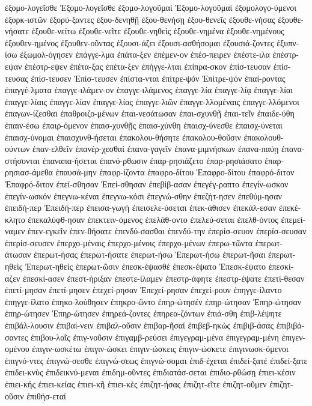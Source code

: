 {ἐξομο-λογεῖσθε
Ἐξομο-λογεῖσθε
ἐξομο-λογοῦμαί
Ἐξομο-λογοῦμαί
ἐξομολογο-ύμενοι
ἐξορκ-ιστῶν
ἐξορύ-ξαντες
ἐξου-δενηθῇ
ἐξου-θενήσῃ
ἐξου-θενεῖς
ἐξουθε-νήσας
ἐξουθε-νήσατε
ἐξουθε-νείτω
ἐξουθε-νεῖτε
ἐξουθε-νηθεὶς
ἐξουθε-νημένα
ἐξουθε-νημένους
ἐξουθεν-ημένος
ἐξουθεν-οῦντας
ἐξουσι-άζει
ἐξουσι-ασθήσομαι
ἐξουσιά-ζοντες
ἐξυπν-ίσω
ἐξωμολ-όγησεν
ἐπάγγε-λμα
ἐπάτα-ξεν
ἐπέμεν-ον
ἐπέσ-πειρεν
ἐπέστε-ιλα
ἐπέστρ-εψαν
ἐπέστρ-εψεν
ἐπέτα-ξας
ἐπέτα-ξεν
ἐπήγγε-λται
ἐπίπρα-σκον
ἐπίσ-τευσαν
ἐπίσ-τευσας
ἐπίσ-τευσεν
Ἐπίσ-τευσεν
ἐπίστα-νται
ἐπίτρε-ψόν
Ἐπίτρε-ψόν
ἐπαί-ροντας
ἐπαγγέ-λματα
ἐπαγγε-ιλάμεν-ον
ἐπαγγε-ιλάμενος
ἐπαγγε-λία
ἐπαγγε-λίᾳ
ἐπαγγε-λίαι
ἐπαγγε-λίαις
ἐπαγγε-λίαν
ἐπαγγε-λίας
ἐπαγγε-λιῶν
ἐπαγγε-λλομέναις
ἐπαγγε-λλόμενοι
ἐπαγων-ίζεσθαι
ἐπαθροιζο-μένων
ἐπαι-νεσάτωσαν
ἐπαι-σχυνθῇ
ἐπαι-τεῖν
ἐπαιδε-ύθη
ἐπαιν-έσω
ἐπαιρ-όμενον
ἐπαισ-χυνθῇς
ἐπαισ-χύνθη
ἐπαισχ-ύνεσθε
ἐπαισχ-ύνεται
ἐπαισχ-ύνομαι
ἐπαισχυνθ-ήσεται
ἐπακολου-θήσητε
ἐπακολου-θοῦσιν
ἐπακολουθ-ούντων
ἐπαν-ελθεῖν
ἐπανέρ-χεσθαί
ἐπανα-γαγεῖν
ἐπανα-μιμνήσκων
ἐπανα-παύῃ
ἐπανα-στήσονται
ἐπαναπα-ήσεται
ἐπανό-ρθωσιν
ἐπαρ-ρησιάζετο
ἐπαρ-ρησιάσατο
ἐπαρ-ρησιασ-άμεθα
ἐπαυσά-μην
ἐπαφρ-ίζοντα
ἐπαφρο-δίτου
Ἐπαφρο-δίτου
ἐπαφρό-διτον
Ἐπαφρό-διτον
ἐπεί-σθησαν
Ἐπεί-σθησαν
ἐπεβίβ-ασαν
ἐπεγέγ-ραπτο
ἐπεγίν-ωσκον
ἐπεγίν-ωσκόν
ἐπεγνω-κέναι
ἐπεγνω-κόσι
ἐπεγνώ-σθην
ἐπεζήτ-ησεν
ἐπεθύμ-ησαν
ἐπειδή-περ
Ἐπειδή-περ
ἐπεισα-γωγὴ
ἐπεισελε-ύσεται
ἐπεκ-άθισεν
ἐπεκάλ-εσαν
ἐπεκέ-κλητο
ἐπεκαλύφθ-ησαν
ἐπεκτειν-όμενος
ἐπελάθ-οντο
ἐπελεύ-σεται
ἐπελθ-όντος
ἐπεμεί-ναμεν
ἐπεν-εγκεῖν
ἐπεν-θήσατε
ἐπενδύ-σασθαι
ἐπενδύ-την
ἐπερίσ-σευον
ἐπερίσ-σευσαν
ἐπερίσ-σευσεν
ἐπερχο-μέναις
ἐπερχο-μένοις
ἐπερχο-μένων
ἐπερω-τῶντα
ἐπερωτ-άτωσαν
ἐπερωτ-ήσας
ἐπερωτ-ήσατε
ἐπερωτ-ήσω
Ἐπερωτ-ήσω
ἐπερωτ-ῆσαι
ἐπερωτ-ηθεὶς
Ἐπερωτ-ηθεὶς
ἐπερωτ-ῶσιν
ἐπεσκ-έψασθέ
ἐπεσκ-έψατο
Ἐπεσκ-έψατο
ἐπεσκί-αζεν
ἐπεσκί-ασεν
ἐπεστ-ήριξαν
ἐπεστε-ίλαμεν
ἐπεστρ-άφητε
ἐπεστρ-έψατε
ἐπετί-θεσαν
ἐπετί-μησαν
ἐπετί-μησεν
ἐπεχεί-ρησαν
Ἐπεχεί-ρησαν
ἐπεχεί-ρουν
ἐπηγγε-ίλαντο
ἐπηγγε-ίλατο
ἐπηκο-λούθησεν
ἐπηκρο-ῶντο
ἐπηρ-ώτησέν
ἐπηρ-ώτησαν
Ἐπηρ-ώτησαν
ἐπηρ-ώτησεν
Ἐπηρ-ώτησεν
ἐπηρεά-ζοντες
ἐπηρεα-ζόντων
ἐπιά-σθη
ἐπιβ-λέψητε
ἐπιβάλ-λουσιν
ἐπιβαί-νειν
ἐπιβαλ-οῦσιν
ἐπιβαρ-ῆσαί
ἐπιβεβ-ηκὼς
ἐπιβιβ-άσας
ἐπιβιβά-σαντες
ἐπιβου-λαῖς
ἐπιγ-νοῦσιν
ἐπιγαμβ-ρεύσει
ἐπιγεγραμ-μένα
ἐπιγεγραμ-μένη
ἐπιγεν-ομένου
ἐπιγιν-ωσκέτω
ἐπιγιν-ώσκει
ἐπιγιν-ώσκεις
ἐπιγιν-ώσκετε
ἐπιγινωσκ-όμενοι
ἐπιγνό-ντες
ἐπιγνώ-σεσθε
ἐπιγνώ-σεως
ἐπιγνώ-σομαι
ἐπιδ-έχεται
ἐπιδεί-ξατέ
ἐπιδεί-ξατε
ἐπιδει-κνὺς
ἐπιδεικνύ-μεναι
ἐπιδημ-οῦντες
ἐπιδιατάσ-σεται
ἐπιδιο-ρθώσῃ
ἐπιει-κέσιν
ἐπιει-κής
ἐπιει-κείας
ἐπιει-κῆ
ἐπιει-κὲς
ἐπιζητ-ήσας
ἐπιζητ-εῖτε
ἐπιζητ-οῦμεν
ἐπιζητ-οῦσιν
ἐπιθήσ-εταί
}
